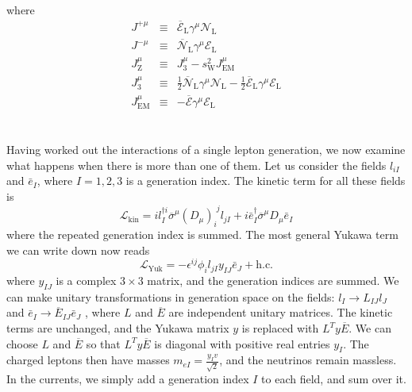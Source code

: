 where
\begin{eqnarray}
J^{+\mu} &\equiv & \overline{\mathcal{E}}_{\mathrm{L}} \gamma^{\mu} \mathcal{N}_{\mathrm{L}} \nonumber \\
J^{-\mu} &\equiv & \overline{\mathcal{N}}_{\mathrm{L}} \gamma^{\mu} \mathcal{E}_{\mathrm{L}} \nonumber \\
J_{\mathrm{Z}}^{\mu} &\equiv & J_3^{\mu} - s_{\mathrm{W}}^2 J^{\mu}_{\mathrm{EM}} \nonumber \\
J_3^{\mu} &\equiv & \frac{1}{2}\overline{\mathcal{N}}_{\mathrm{L}} \gamma^{\mu} \mathcal{N}_{\mathrm{L}} - \frac{1}{2}\overline{\mathcal{E}}_{\mathrm{L}} \gamma^{\mu} \mathcal{E}_{\mathrm{L}} \nonumber \\
J^{\mu}_{\mathrm{EM}} &\equiv &  -\overline{\mathcal{E}} \gamma^{\mu} \mathcal{E}_{\mathrm{L}} \nonumber
\end{eqnarray}
\\ \\
Having worked out the interactions of a single lepton generation, we now examine what happens when there is more than one of them. 
Let us consider the fields $l_{iI}$ and $\bar{e}_{I}$, where $I=1,2,3$ is a generation index. The kinetic term for all these fields is
\[\mathcal{L}_{\mathrm{kin}} = il^{\dagger i}_I \overline{\sigma}^{\mu}(D_{\mu})_{i}^{\phantom{i}j} l_{jI} + i\bar{e}_I^{\dagger}\overline{\sigma}^{\mu}D_{\mu}\bar{e}_I\]
where the repeated generation index is summed. The most general Yukawa term we can write down now reads
\[\mathcal{L}_{\mathrm{Yuk}} = -\epsilon^{ij}\phi_i l_{jI}y_{IJ} \bar{e}_{J} + \mathrm{h.c.}\]
where $y_{IJ}$ is a complex $3 \times 3$ matrix, and the generation indices are summed.
We can make unitary transformations in generation space on the fields: $l_I \to L_{IJ} l_J$ and $\bar{e}_I \to \overline{E}_{IJ}\bar{e}_J$ , where $L$ and $\overline{E}$ are independent unitary matrices.
The kinetic terms are unchanged, and the Yukawa matrix $y$ is replaced with $L^T y \overline{E} $. We can choose $L$ and $\overline{E}$ so that $L^T y \overline{E}$ is diagonal with positive real entries $y_I$. The charged leptons then have masses $m_{eI} = \frac{y_Iv}{\sqrt{2}}$, and the neutrinos remain massless. In the currents, we simply add a generation index $I$ to each field, and sum over it.

